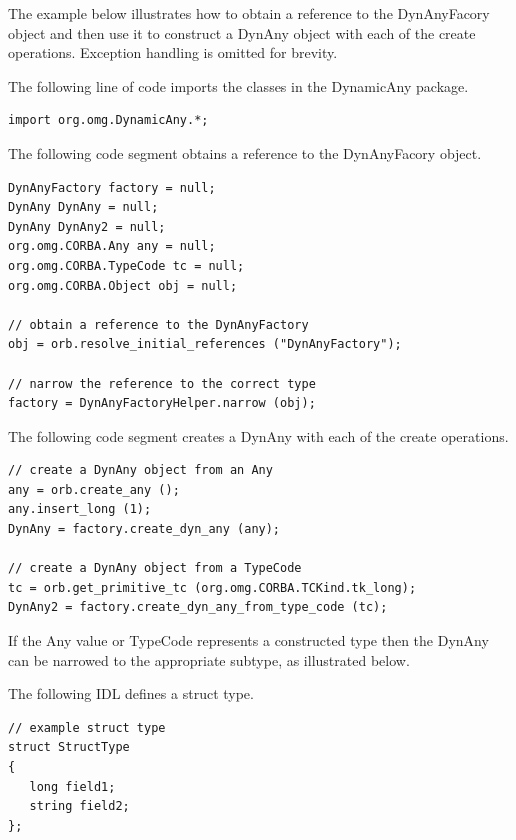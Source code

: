 The example below illustrates how to obtain a reference to the
DynAnyFacory object and then use it to construct a DynAny object with
each of the create operations.  Exception handling is omitted for
brevity.

The following line of code imports the classes in the DynamicAny
package.

\begin{small}
\begin{verbatim}
import org.omg.DynamicAny.*;

\end{verbatim}
\end{small}

The following code segment obtains a reference to the DynAnyFacory
object.

\begin{small}
\begin{verbatim}
DynAnyFactory factory = null;
DynAny DynAny = null;
DynAny DynAny2 = null;
org.omg.CORBA.Any any = null;
org.omg.CORBA.TypeCode tc = null;
org.omg.CORBA.Object obj = null;

// obtain a reference to the DynAnyFactory
obj = orb.resolve_initial_references ("DynAnyFactory");

// narrow the reference to the correct type
factory = DynAnyFactoryHelper.narrow (obj);

\end{verbatim}
\end{small}

The following code segment creates a DynAny with each of the create
operations.

\begin{small}
\begin{verbatim}
// create a DynAny object from an Any
any = orb.create_any ();
any.insert_long (1);
DynAny = factory.create_dyn_any (any);

// create a DynAny object from a TypeCode
tc = orb.get_primitive_tc (org.omg.CORBA.TCKind.tk_long);
DynAny2 = factory.create_dyn_any_from_type_code (tc);

\end{verbatim}
\end{small}

If the Any value or TypeCode represents a constructed type then the
DynAny can be narrowed to the appropriate subtype, as illustrated
below.

The following IDL defines a struct type.

\begin{small}
\begin{verbatim}
// example struct type
struct StructType
{
   long field1;
   string field2;
};

\end{verbatim}
\end{small}

